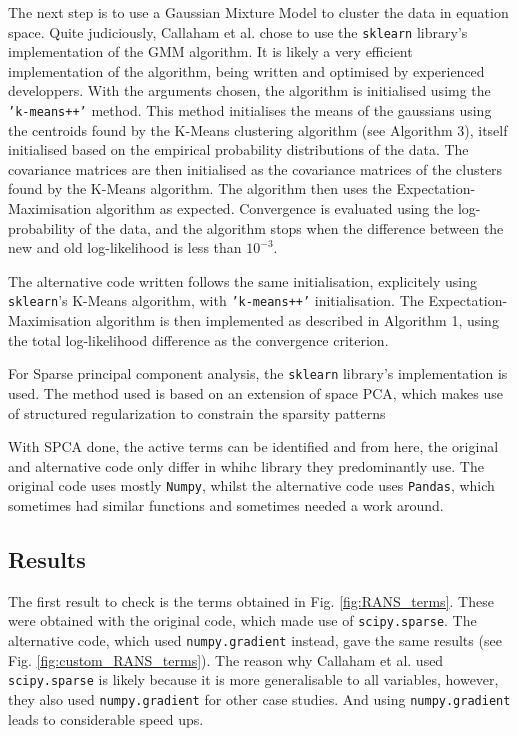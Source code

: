 \documentclass[12pt]{report} %
\begin{document}
The next step is to use a Gaussian Mixture Model to cluster the data in equation space. Quite judiciously, Callaham et al. chose to use the \texttt{sklearn} library's implementation of the GMM algorithm. It is likely a very efficient implementation of the algorithm, being written and optimised by experienced developpers. With the arguments chosen, the algorithm is initialised usimg the \texttt{'k-means++'} method. This method initialises the means of the gaussians using the centroids found by the K-Means clustering algorithm (see Algorithm 3), itself initialised based on the empirical probability distributions of the data\cite{arthur2007kmeans}. The covariance matrices are then initialised as the covariance matrices of the clusters found by the K-Means algorithm. The algorithm then uses the Expectation-Maximisation algorithm as expected. Convergence is evaluated using the log-probability of the data, and the algorithm stops when the difference between the new and old log-likelihood is less than $10^{-3}$.

The alternative code written follows the same initialisation, explicitely using \texttt{sklearn}'s K-Means algorithm, with \texttt{'k-means++'} initialisation. The Expectation-Maximisation algorithm is then implemented as described in Algorithm 1, using the total log-likelihood difference as the convergence criterion.

For Sparse principal component analysis, the \texttt{sklearn} library's implementation is used. The method used is based on an extension of space PCA, which makes use of structured regularization to constrain the sparsity patterns

With SPCA done, the active terms can be identified and from here, the original and alternative code only differ in whihc library they predominantly use. The original code uses mostly \texttt{Numpy}, whilst the alternative code uses \texttt{Pandas}, which sometimes had similar functions and sometimes needed a work around.


\subsection{Results}


The first result to check is the terms obtained in Fig. \ref{fig:RANS_terms}. These were obtained with the original code, which made use of \texttt{scipy.sparse}. The alternative code, which used \texttt{numpy.gradient} instead, gave the same results (see Fig. \ref{fig:custom_RANS_terms}). The reason why Callaham et al. used \texttt{scipy.sparse} is likely because it is more generalisable to all variables, however, they also used \texttt{numpy.gradient} for other case studies. And using \texttt{numpy.gradient} leads to considerable speed ups.
\end{document}
